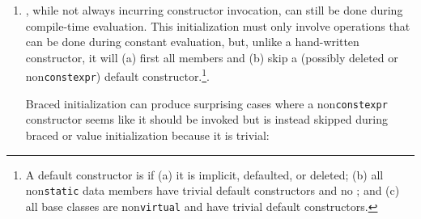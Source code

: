 \begin{enumerate}
{\begin{emcppslisting}
struct S1a { I3b i;            S1a()        { } };  // OK, (ù{}ù) is init.
struct S1b { I3b i;  constexpr S1b()        { } };  // OK, literal type.

struct S2a { I3b i;            S2a() = default; };  // OK, literal type.
struct S2b { I3b i;  constexpr S2b() = default; };  // OK, literal type.
\end{emcppslisting}


\noindent The example code above attempts to illustrate the subtle differences
between a data member of \emph{scalar}  (e.g.,
\lstinline!int!) and one of \emph{user-defined}  (e.g.,
\lstinline!I3b!). The first difference, illustrated by \lstinline!I1a! versus
\lstinline!S1a!, is that the former always leaves its own data member,
\lstinline!i!, uninitialized, while the latter invariably zero-initializes
its \lstinline!i!. The second difference, seen in \lstinline!I1b! versus
\lstinline!S1b!, is that the former is explicitly not initialized whereas
it is always implicitly initialized in the latter.

Note that, although every  needs to have a way to
construct it in a , not \emph{every}
constructor of a  needs to be ;
see .}


\item{, while not always incurring constructor invocation, can still be done during compile-time evaluation. This initialization must only involve operations that can be done during constant evaluation, but, unlike a hand-written constructor, it will (a) first  all members and (b) skip a (possibly deleted or non\lstinline!constexpr!)  default constructor.\cprotect\footnote{A default constructor is  if (a) it is implicit, defaulted, or deleted; (b) all non\lstinline!static! data members have trivial default constructors and no ; and (c) all base classes are non\lstinline!virtual! and have trivial default constructors.}.

Braced initialization can produce surprising cases where a
non\lstinline!constexpr! constructor seems like it should be invoked but is
instead skipped during braced or value initialization because it is
trivial:

}
\end{enumerate}
